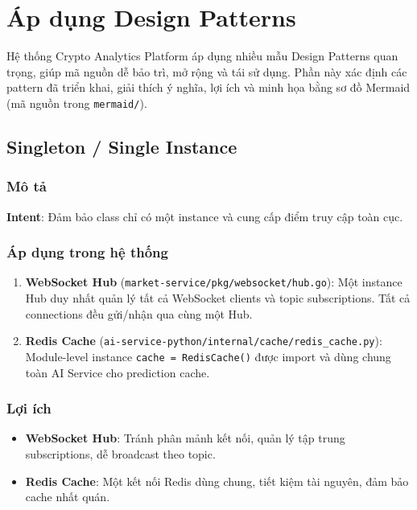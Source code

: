 
\section{Áp dụng Design Patterns}
\label{sec:design-patterns}

Hệ thống Crypto Analytics Platform áp dụng nhiều mẫu Design Patterns quan trọng, giúp mã nguồn dễ bảo trì, mở rộng và tái sử dụng. Phần này xác định các pattern đã triển khai, giải thích ý nghĩa, lợi ích và minh họa bằng sơ đồ Mermaid (mã nguồn trong \texttt{mermaid/}).

\subsection{Singleton / Single Instance}

\subsubsection{Mô tả}

\textbf{Intent}: Đảm bảo class chỉ có một instance và cung cấp điểm truy cập toàn cục.

\subsubsection{Áp dụng trong hệ thống}

\begin{enumerate}
    \item \textbf{WebSocket Hub} (\texttt{market-service/pkg/websocket/hub.go}): Một instance Hub duy nhất quản lý tất cả WebSocket clients và topic subscriptions. Tất cả connections đều gửi/nhận qua cùng một Hub.
    
    \item \textbf{Redis Cache} (\texttt{ai-service-python/internal/cache/redis\_cache.py}): Module-level instance \texttt{cache = RedisCache()} được import và dùng chung toàn AI Service cho prediction cache.
\end{enumerate}

\subsubsection{Lợi ích}

\begin{itemize}
    \item \textbf{WebSocket Hub}: Tránh phân mảnh kết nối, quản lý tập trung subscriptions, dễ broadcast theo topic.
    \item \textbf{Redis Cache}: Một kết nối Redis dùng chung, tiết kiệm tài nguyên, đảm bảo cache nhất quán.
\end{itemize}


